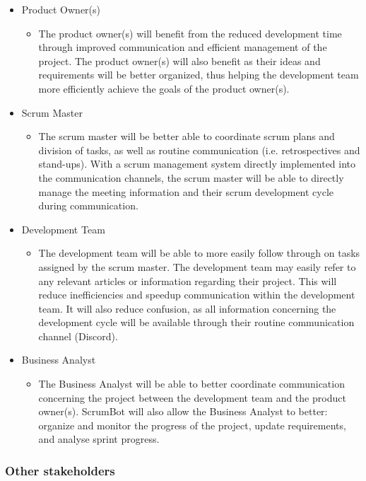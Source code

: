 \documentclass[12pt, titlepage]{article}
\begin{document}
\begin{itemize}
    \item Product Owner(s)
    \begin{itemize}
      \item[] The product owner(s) will benefit from the reduced development time through improved communication and efficient management of the project. The product owner(s) will also benefit as their ideas and requirements will be better organized, thus helping the development team more efficiently achieve the goals of the product owner(s).
    \end{itemize}
    \item Scrum Master
    \begin{itemize}
      \item[] The scrum master will be better able to coordinate scrum plans and division of tasks, as well as routine communication (i.e. retrospectives and stand-ups). With a scrum management system directly implemented into the communication channels, the scrum master will be able to directly manage the meeting information and their scrum development cycle during communication.
    \end{itemize}
    \item Development Team
    \begin{itemize}
      \item[] The development team will be able to more easily follow through on tasks assigned by the scrum master. The development team may easily refer to any relevant articles or information regarding their project. This will reduce inefficiencies and speedup communication within the development team. It will also reduce confusion, as all information concerning the development cycle will be available through their routine communication channel (Discord).
    \end{itemize}
    \item Business Analyst
    \begin{itemize}
      \item[] The Business Analyst will be able to better coordinate communication concerning the project between the development team and the product owner(s). ScrumBot will also allow the Business Analyst to better: organize and monitor the progress of the project, update requirements, and analyse sprint progress.
    \end{itemize}
\end{itemize}
\subsubsection{Other stakeholders}
\end{document}
